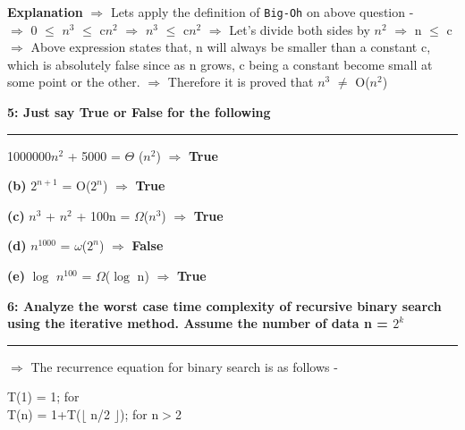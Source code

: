 \documentclass[12pt]{article}
\newcommand\question[3]{\vspace{.25in}\textbf{#1: #2}\vspace{.5em}\hrule\vspace{.10in}}
\renewcommand\part[1]{\vspace{.10in}\textbf{(#1)}}
\begin{document}
\textbf{Explanation} $\Rightarrow$ Lets apply the definition of \texttt{Big-Oh} on above question - \\
$\Rightarrow$ 0 $\leq$ $n^3$ $\leq$ c$n^2$
$\Rightarrow$ $n^3$ $\leq$ c$n^2$
$\Rightarrow$ Let's divide both sides by $n^2$
$\Rightarrow$ n $\leq$ c
$\Rightarrow$ Above expression states that, n will always be smaller than a constant c, which is absolutely false since as n grows, c being a constant become small at some point or the other.
$\Rightarrow$ Therefore it is proved that $n^3$ $\neq$ O($n^2$)

\question{5} {Just say True or False for the following}

\part{a} 1000000$n^2$ + 5000 = $\Theta$ ($n^2$) $\Rightarrow$ \textbf{True}

\part{b} $2^{n+1}$ = O($2^n$) $\Rightarrow$ \textbf{True}

\part{c} $n^3$ + $n^2$ + 100n = $\Omega$($n^3$) $\Rightarrow$ \textbf{True}

\part{d} $n^{1000}$ = $\omega$($2^n$) $\Rightarrow$ \textbf{False}

\part{e} $\log$ $n^{100}$ = $\Omega$($\log$ n) $\Rightarrow$ \textbf{True}

\question{6} {Analyze the worst case time complexity of recursive binary search
using the iterative method. Assume the number of data n = $2^k$}

\textbf{Explanation} $\Rightarrow$ The recurrence equation for binary search is as follows -

T(1) = 1; for  \\
T(n) = 1+T($\lfloor$ n/2 $\rfloor$); for n$>$2
\end{document}
